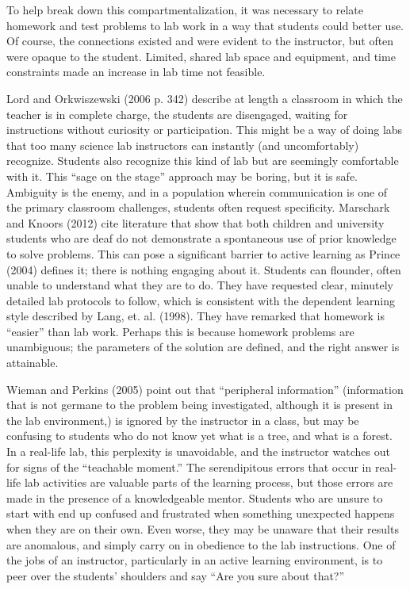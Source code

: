 \documentclass[11.5pt]{sig-alternate} %
\begin{document}
\begin{large}
To help break down this compartmentalization, it was necessary to relate homework and test problems to lab work in a way that students could better use. Of course, the connections existed and were evident to the instructor, but often were opaque to the student. Limited, shared lab space and equipment, and time constraints made an increase in lab time not feasible.

Lord and Orkwiszewski (2006 p. 342) describe at length a classroom in which the teacher is in complete charge, the students are disengaged, waiting for instructions without curiosity or participation. This might be a way of doing labs that too many science lab instructors can instantly (and uncomfortably) recognize. Students also recognize this kind of lab but are seemingly comfortable with it. This “sage on the stage” approach may be boring, but it is safe. Ambiguity is the enemy, and in a population wherein communication is one of the primary classroom challenges, students often request specificity. Marschark and Knoors (2012) cite literature that show that both children and university students who are deaf do not demonstrate a spontaneous use of prior knowledge to solve problems. This can pose a significant barrier to active learning as Prince (2004) defines it; there is nothing engaging about it. Students can flounder, often unable to understand what they are to do. They have requested clear, minutely detailed lab protocols to follow, which is consistent with the dependent learning style described by Lang, et. al. (1998). They have remarked that homework is “easier” than lab work. Perhaps this is because homework problems are unambiguous; the parameters of the solution are defined, and the right answer is attainable.

Wieman and Perkins (2005) point out that “peripheral information” (information that is not germane to the problem being investigated, although it is present in the lab environment,) is ignored by the instructor in a class, but may be confusing to students who do not know yet what is a tree, and what is a forest. In a real-life lab, this perplexity is unavoidable, and the instructor watches out for signs of the “teachable moment.” The serendipitous errors that occur in real-life lab activities are valuable parts of the learning process, but those errors are made in the presence of a knowledgeable mentor. Students who are unsure to start with end up confused and frustrated when something unexpected happens when they are on their own. Even worse, they may be unaware that their results are anomalous, and simply carry on in obedience to the lab instructions. One of the jobs of an instructor, particularly in an active learning environment, is to peer over the students’ shoulders and say “Are you sure about that?”


\end{large}
\end{document}

